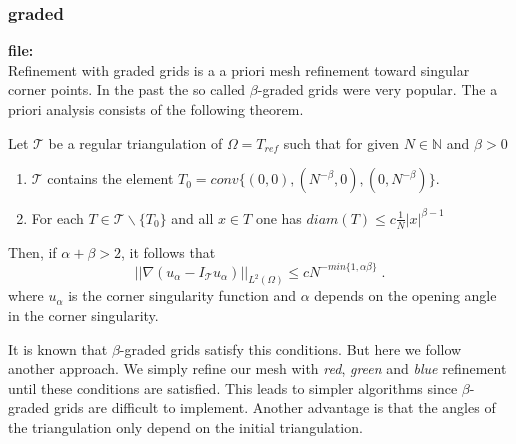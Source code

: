 \subsubsection{graded}
\textbf{file:} \\[1.5ex]
Refinement with graded grids is a a priori mesh refinement toward singular corner points.
In the past the so called $\beta$-graded grids were very popular. The a priori analysis consists of the following theorem.
%
\begin{theorem}
Let $\mathcal{T}$ be a regular triangulation of $\Omega=T_{ref}$ such that for given $N\in\mathbb{N}$ and $\beta>0$
\begin{enumerate}
\item $\mathcal{T}$ contains the element $T_0=conv\{(0,0),(N^{-\beta},0),(0,N^{-\beta})\}$.
\item For each $T\in \mathcal{T}\backslash\{T_0\}$ and all $x\in T$ one has $diam(T)\leq c\frac{1}{N}|x|^{\beta-1}$
\end{enumerate}
Then, if $\alpha + \beta > 2$, it follows that
\begin{equation*}
|| \nabla(u_{\alpha} - I_{\mathcal{T}}u_{\alpha})||_{L^2(\Omega)}\leq c N^{-min\{1,\alpha\beta\}}\; .
\end{equation*}
where $u_{\alpha}$ is the corner singularity function and $\alpha$ depends on the opening angle in the corner singularity.
\end{theorem}
\noindent
It is known that $\beta$-graded grids satisfy this conditions. But here we follow another approach. We simply refine our mesh with \emph{red}, \emph{green} and \emph{blue} refinement until these conditions are satisfied. This leads to simpler algorithms since $\beta$-graded grids are difficult to implement. Another advantage is that the angles of the triangulation only depend on the initial triangulation.
